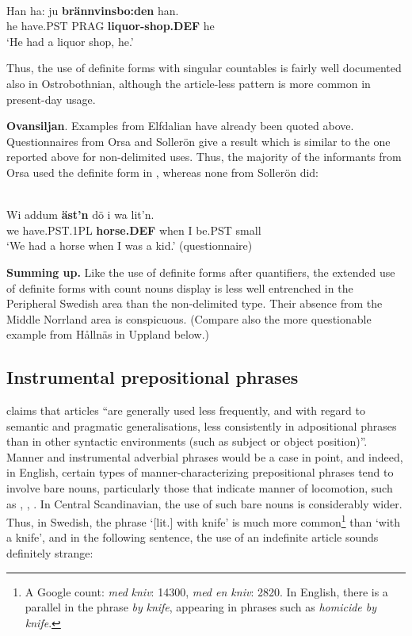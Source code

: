 \ea \label{} 
\\
\gll Han  ha:  ju  \textbf{brännvinsbo:den} han.  \\
he  have.PST  PRAG  \textbf{liquor-shop.DEF} he  \\
\glt ‘He had a liquor shop, he.’ 

\z

Thus, the use of definite forms with singular countables is fairly well documented also in Ostrobothnian, although the article-less pattern is more common in present-day usage.

\textbf{Ovansiljan}. Examples from Elfdalian have already been quoted above. Questionnaires from Orsa and Sollerön give a result which is similar to the one reported above for non-delimited uses. Thus, the majority of the informants from Orsa used the definite form in , whereas none from Sollerön did:

\ea \label{} 
\\
\gll Wi  addum  \textbf{äst’n} dö  i  wa  lit’n.\\
we  have.PST.1PL  \textbf{horse.DEF} when  I   be.PST  small\\
\glt ‘We had a horse when I was a kid.’ (questionnaire)

\z

\textbf{Summing up.} Like the use of definite forms after quantifiers, the extended use of definite forms with count nouns display is less well entrenched in the Peripheral Swedish area than the non-delimited type. Their absence from the Middle Norrland area is conspicuous. (Compare also the more questionable example  from Hållnäs in Uppland below.)

\subsection{ Instrumental prepositional phrases }

\citet{Himmelmann1998} claims that articles “are generally used less frequently, and with regard to semantic and pragmatic generalisations, less consistently in adpositional phrases than in other syntactic environments (such as subject or object position)”. Manner and instrumental adverbial phrases would be a case in point, and indeed, in English, certain types of manner-characterizing prepositional phrases tend to involve bare nouns, particularly those that indicate manner of locomotion, such as , , . In Central Scandinavian, the use of such bare nouns is considerably wider. Thus, in Swedish, the phrase  ‘[lit.] with knife’ is much more common\footnote{ A Google count: \textit{med}\textit{ }\textit{kniv}: 14300, \textit{med en kniv}: 2820. In English, there is a parallel in the phrase \textit{by} \textit{knife}, appearing in phrases such as \textit{homicide by knife}.} than ‘with a knife’, and in the following sentence, the use of an indefinite article sounds definitely strange:

